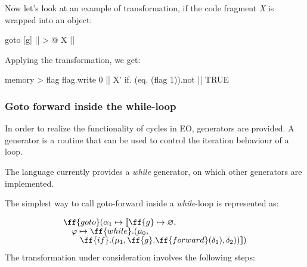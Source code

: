 \documentclass[sigplan,review,11pt,nonacm,natbib=false]{acmart}
\newcommand\br{\\[-4pt]}
\begin{document}
Now let's look at an example of transformation, if the code fragment \emph{X} is wrapped into an object:

\begin{ffcode}
goto
  [g]
    || > @
      X
      ||
\end{ffcode}

Applying the transformation, we get:
\begin{ffcode}
memory > flag
flag.write 0
||
  X'
  if.
    (eq. (flag 1)).not
    ||
    TRUE
\end{ffcode}


\subsubsection{Goto forward inside the while-loop}
In order to realize the functionality of cycles in EO, generators are provided. A generator is a routine that can be used to control the iteration behaviour of a loop.

The language currently provides a \emph{while} generator, on which other generators are implemented.

The simplest way to call goto-forward inside a \emph{while}-loop is represented as:

\begin{equation}
\begin{split}
& \ff{goto} ( \alpha_1 \mapsto \llbracket \ff{g} \mapsto \varnothing, \br
& \quad \varphi \mapsto \ff{while}.(\mu_0, \br
& \quad \quad \ff{if}.(\mu_1, \ff{g}.\ff{forward}(\delta_1), \delta_2) ) \rrbracket) \br
\end{split}
\end{equation}

The transformation under consideration involves the following steps:

\end{document}
